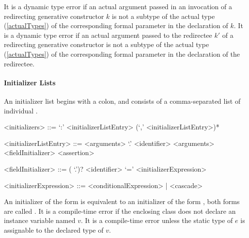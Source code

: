 \documentclass[makeidx]{article}
\begin{document}
\LMHash{}%
It is a dynamic type error if an actual argument passed
in an invocation of a redirecting generative constructor $k$
is not a subtype of the actual type (\ref{actualTypes})
of the corresponding formal parameter in the declaration of $k$.
It is a dynamic type error if an actual argument passed
to the redirectee $k'$ of a redirecting generative constructor
is not a subtype of the actual type
(\ref{actualTypes})
of the corresponding formal parameter in the declaration of the redirectee.


\paragraph{Initializer Lists}

\LMHash{}%
An initializer list begins with a colon,
and consists of a comma-separated list of individual .


\begin{grammar}
<initializers> ::= `:' <initializerListEntry> (`,' <initializerListEntry>)*

<initializerListEntry> ::= \SUPER{} <arguments>
  \alt \SUPER{} `.' <identifier> <arguments>
  \alt <fieldInitializer>
  \alt <assertion>

<fieldInitializer> ::= \gnewline{}
  (\THIS{} `.')? <identifier> `=' <initializerExpression>

<initializerExpression> ::= <conditionalExpression> | <cascade>
\end{grammar}

\LMHash{}%
An initializer of the form  is equivalent to
an initializer of the form ,
both forms are called .
It is a compile-time error if the enclosing class
does not declare an instance variable named $v$.
It is a compile-time error unless the static type of $e$
is assignable to the declared type of $v$.
\end{document}
